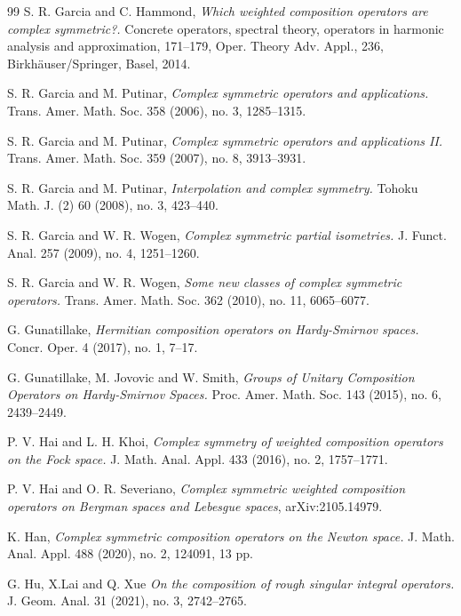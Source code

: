 \documentclass[11pt]{amsart}%
\theoremstyle{definition}
\theoremstyle{remark}
\numberwithin{equation}{section}
\begin{document}
\begin{thebibliography}{99}
S. R. Garcia and C. Hammond, \emph{Which weighted composition
operators are complex symmetric?.} Concrete operators, spectral theory,
operators in harmonic analysis and approximation, 171--179, Oper. Theory Adv.
Appl., 236, Birkh\"auser/Springer, Basel, 2014.

S. R. Garcia and M. Putinar, \emph{Complex symmetric operators
and applications.} Trans. Amer. Math. Soc. 358 (2006), no. 3, 1285--1315.

S. R. Garcia and M. Putinar, \emph{Complex symmetric operators
and applications II.} Trans. Amer. Math. Soc. 359 (2007), no. 8, 3913--3931.

S. R. Garcia and M. Putinar, \emph{Interpolation and complex
symmetry.} Tohoku Math. J. (2) 60 (2008), no. 3, 423--440.


S. R. Garcia and W. R. Wogen, \emph{Complex symmetric partial
isometries.} J. Funct. Anal. 257 (2009), no. 4, 1251--1260.

S. R. Garcia and W. R. Wogen, \emph{Some new classes of
complex symmetric operators.} Trans. Amer. Math. Soc. 362 (2010), no. 11, 6065--6077.

G. Gunatillake, \emph{Hermitian composition operators on
Hardy-Smirnov spaces.} Concr. Oper. 4 (2017), no. 1, 7--17.

G. Gunatillake, M. Jovovic and W. Smith, \emph{Groups of
Unitary Composition Operators on Hardy-Smirnov Spaces.} Proc. Amer. Math. Soc.
143 (2015), no. 6, 2439--2449.

P. V. Hai and L. H. Khoi, \emph{Complex symmetry of weighted
composition operators on the Fock space.} J. Math. Anal. Appl. 433 (2016), no.
2, 1757--1771.

P. V. Hai and O. R. Severiano, \emph{Complex symmetric weighted
composition operators on Bergman spaces and Lebesgue spaces}, arXiv:2105.14979.

K. Han, \emph{Complex symmetric composition operators on the
Newton space.} J. Math. Anal. Appl. 488 (2020), no. 2, 124091, 13 pp.

G. Hu, X.Lai and Q. Xue \emph{On the composition of rough
singular integral operators.} J. Geom. Anal. 31 (2021), no. 3, 2742--2765.


\end{thebibliography}
\end{document}
